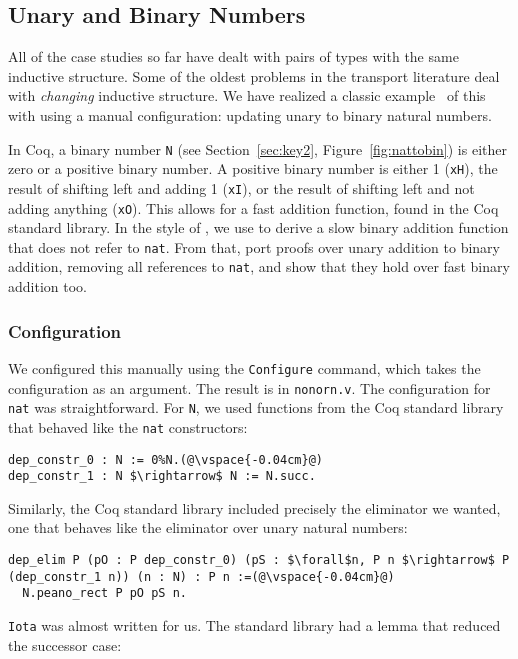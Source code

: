 \subsection{Unary and Binary Numbers}
\label{sec:bin}

All of the case studies so far have dealt with pairs of types with the same inductive structure.
Some of the oldest problems in the transport literature deal with \textit{changing} inductive
structure.
We have realized a classic example~\cite{magaud2000changing}  of this with \toolname using a manual configuration:
updating unary to binary natural numbers.

In Coq, a binary number \lstinline{N} (see Section~\ref{sec:key2}, Figure~\ref{fig:nattobin}) is either zero or a positive binary number. A positive binary number
is either 1 (\lstinline{xH}), the result of shifting left and adding 1 (\lstinline{xI}),
or the result of shifting left and not adding anything (\lstinline{xO}).
This allows for a fast addition function, found in the Coq standard library.
In the style of \citet{magaud2000changing}, we use \toolname to derive a slow binary
addition function that does not refer to \lstinline{nat}.
From that, port proofs over unary addition to binary addition,
removing all references to \lstinline{nat}, and show that they hold over fast binary addition too.

\subsubsection{Configuration}
We configured this manually using the \lstinline{Configure} command,
which takes the configuration as an argument.
The result is in \lstinline{nonorn.v}.
The configuration for \lstinline{nat} was straightforward.
For \lstinline{N}, we used functions from the Coq standard library that
behaved like the \lstinline{nat} constructors:

\begin{lstlisting}
dep_constr_0 : N := 0%N.(@\vspace{-0.04cm}@)
dep_constr_1 : N $\rightarrow$ N := N.succ.
\end{lstlisting}
Similarly, the Coq standard library included precisely the eliminator we wanted, one that behaves
like the eliminator over unary natural numbers:

\begin{lstlisting}
dep_elim P (pO : P dep_constr_0) (pS : $\forall$n, P n $\rightarrow$ P (dep_constr_1 n)) (n : N) : P n :=(@\vspace{-0.04cm}@)
  N.peano_rect P pO pS n.
\end{lstlisting}
\lstinline{Iota} was almost written for us.
The standard library had a lemma that reduced the successor case:

